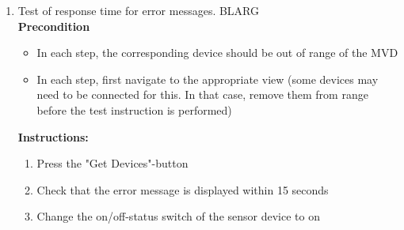 \documentclass[a4paper]{article}
\newlength{\testlabellength}
\newenvironment{testlist}{\begin{enumerate}[label=\bfseries Instruction \thesubsection.\arabic* , labelindent=0pt, labelwidth=\testlabellength , leftmargin=2cm]}{\end{enumerate}}
\newenvironment{precondition}{
{\color{white}BLARG}\\ 
\textbf{Precondition}
\begin{itemize}[labelindent=0cm, labelwidth=2cm , leftmargin=1cm]
}
{\end{itemize}}
\newenvironment{instruction}{
\textbf{Instructions:}
\begin{enumerate}[label=\bfseries  \arabic*., labelindent=0cm, labelwidth=2cm , leftmargin=1cm]
}
{\end{enumerate}}
\newenvironment{postcondition}{
\textbf{Postcondition:}
\begin{itemize}[labelindent=0cm, labelwidth=2cm , leftmargin=1cm]
}
{\end{itemize}}
\begin{document}
\begin{appendices}
\begin{testlist}
\begin{instruction}
            \item Turn the ligt bulb on by flicking the switch
            \item Check that the response time for the interaction is below two seconds
            \item Press "Get"-button
            \item Check that the response time for the interaction is below two seconds
            \item Enter any value in the color fields
            \item Check that the response time for the interaction is below two seconds
            \item Press "Set"-button
            \item Check that the response time for the interaction is below two seconds
            \item Turn the light bulb off by flicking the switch
            \item Check that the response time for the interaction is below two seconds
            \item Press "Back"-button until the application is closed
            \item Check that the response time for the interaction is below two seconds
		\end{instruction}
		\begin{postcondition}
			\item Application is not running
		\end{postcondition}
\newpage
	\item Test of response time for error messages.
		\begin{precondition} 
			\item In each step, the corresponding device should be out of range of the MVD
			\item In each step, first navigate to the appropriate view (some devices may need to be connected for this. In that case, remove them from range before the test instruction is performed)
		\end{precondition}
		\begin{instruction}
			\item Press the "Get Devices"-button
			\item Check that the error message is displayed within 15 seconds
			\item Change the on/off-status switch of the sensor device to on

\end{instruction}
\end{testlist}
\end{appendices}
\end{document}
